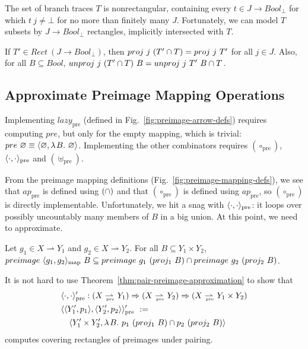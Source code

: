\documentclass{llncs}
\newcommand{\figref}[1]{Fig.~\ref{#1}}
\newcommand{\pto}{\rightharpoonup}
\newcommand{\arrowlazy}{\ensuremath{lazy}}
\newcommand{\map}{_\mathrm{map}}
\newcommand{\pre}{_\mathrm{pre}}
\newcommand{\lazypre}{\arrowlazy\pre}
\newcommand{\prepto}{\pto_{\mspace{-19mu}\pre}}
\begin{document}
The set of branch traces $T$ is nonrectangular, containing every $t \in J \to Bool_\bot$ for which $t~j \neq \bot$ for no more than finitely many $J$.
Fortunately, we can model $T$ subsets by $J \to Bool_\bot$ rectangles, implicitly intersected with $T$.

\begin{theorem}
If $T' \in Rect~(J \to Bool_\bot)$, then $proj~j~(T' \cap T) = proj~j~T'$ for all $j \in J$.
Also, for all $B \subseteq Bool$, $unproj~j~(T' \cap T)~B = unproj~j~T'~B \cap T$.
\end{theorem}


\subsection{Approximate Preimage Mapping Operations}

Implementing $\lazypre$ (defined in \figref{fig:preimage-arrow-defs}) requires computing $pre$, but only for the empty mapping, which is trivial: $pre~\varnothing \equiv \langle{\varnothing,\lambda\mspace{2mu}{B}\ldotp\,\varnothing}\rangle$.
Implementing the other combinators requires $(\circ\pre)$, $\pair{\cdot,\cdot}\pre$ and $(\uplus\pre)$.

From the preimage mapping definitions (\figref{fig:preimage-mapping-defs}), we see that $ap\pre$ is defined using $(\cap)$ and that $(\circ\pre)$ is defined using $ap\pre$, so $(\circ\pre)$ is directly implementable.
Unfortunately, we hit a snag with $\pair{\cdot,\cdot}\pre$: it loops over possibly uncountably many members of $B$ in a big union.
At this point, we need to approximate.

\begin{theorem}
\label{thm:pair-preimage-approximation}
Let $g_1 \in X \pto Y_1$ and $g_2 \in X \pto Y_2$.
For all $B \subseteq Y_1 \times Y_2$, $preimage~\pair{g_1,g_2}\map~B \subseteq preimage~g_1~(proj_1~B) \i preimage~g_2~(proj_2~B)$.%
\end{theorem}

It is not hard to use Theorem~\ref{thm:pair-preimage-approximation} to show that
\begin{equation}
\begin{aligned}
	&\pair{\cdot,\cdot}\pre' : (X \prepto Y_1) \tto (X \prepto Y_2) \tto (X \prepto Y_1 \times Y_2) \\
	&\pair{\pair{Y_1',p_1},\pair{Y_2',p_2}}\pre' \ := \ \\
	&\tab\pair{Y_1' \times Y_2',\fun{B}{p_1~(proj_1~B) \i p_2~(proj_2~B)}}
\end{aligned}
\end{equation}
computes covering rectangles of preimages under pairing.
\end{document}
